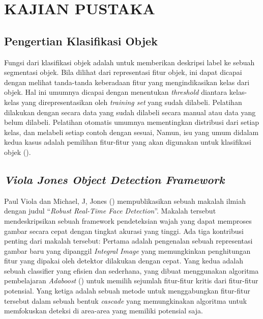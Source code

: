 
\chapter{KAJIAN PUSTAKA}

\section{Pengertian Klasifikasi Objek}

Fungsi dari klasifikasi objek adalah untuk memberikan deskripsi label ke 
sebuah segmentasi objek. Bila dilihat dari representasi fitur objek, ini 
dapat dicapai dengan melihat tanda-tanda keberadaan fitur yang mengindikasikan 
kelas dari objek. Hal ini umumnya dicapai dengan menentukan \textit{threshold} diantara 
kelas-kelas yang direpresentasikan oleh \textit{training set} yang sudah dilabeli. 
Pelatihan dilakukan dengan secara data yang sudah dilabeli secara manual atau 
data yang belum dilabeli. Pelatihan otomatis umumnya mementingkan distribusi dari 
setiap kelas, dan melabeli setiap contoh dengan sesuai, Namun, isu yang umum 
didalam kedua kasus adalah pemilihan fitur-fitur yang akan digunakan untuk 
klasifikasi objek (\cite{rennoetal}).

\section{\emph{Viola Jones Object Detection Framework}}

Paul Viola dan Michael, J, Jones (\cite{rennoetal}) mempublikasikan sebuah makalah ilmiah dengan 
judul “\emph{Robust Real-Time Face Detection}”. Makalah tersebut mendeskripsikan sebuah 
framework pendeteksian wajah yang dapat memproses gambar secara cepat dengan 
tingkat akurasi yang tinggi. Ada tiga kontribusi penting dari makalah tersebut: 
Pertama adalah pengenalan sebuah representasi gambar baru yang dipanggil 
\emph{Integral Image} yang memungkinkan penghitungan fitur yang dipakai oleh detektor 
dilakukan dengan cepat. Yang kedua adalah sebuah classifier yang efisien dan 
sederhana, yang dibuat menggunakan algoritma pembelajaran \emph{Adaboost} 
(\cite{freundetal}) untuk memilih sejumlah fitur-fitur kritis dari 
fitur-fitur potensial. Yang ketiga adalah sebuah metode untuk menggabungkan 
fitur-fitur tersebut dalam sebuah bentuk \emph{cascade} yang memungkinakan algoritma 
untuk memfokuskan deteksi di area-area yang memiliki potensial saja.

